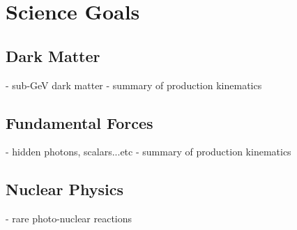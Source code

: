 \section{Science Goals}

\subsection{Dark Matter}
 - sub-GeV dark matter
 - summary of production kinematics

\subsection{Fundamental Forces}
 - hidden photons, scalars...etc
 - summary of production kinematics 

\subsection{Nuclear Physics}
 - rare photo-nuclear reactions
